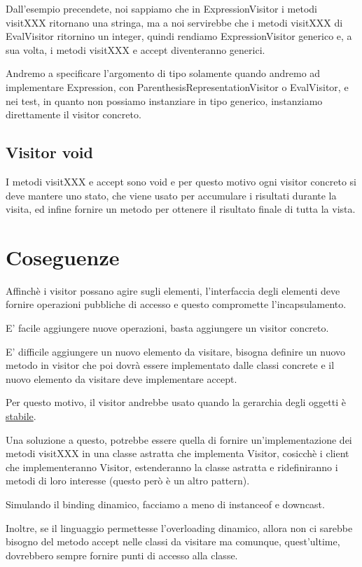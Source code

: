 Dall'esempio precendete, noi sappiamo che in ExpressionVisitor i metodi visitXXX ritornano una stringa, ma a noi servirebbe che i metodi visitXXX di EvalVisitor 
ritornino un integer, quindi rendiamo ExpressionVisitor generico e, a sua volta, i metodi visitXXX e accept diventeranno generici.

Andremo a specificare l'argomento di tipo solamente quando andremo ad implementare Expression, con ParenthesisRepresentationVisitor o EvalVisitor, e nei test, in quanto
non possiamo instanziare in tipo generico, instanziamo direttamente il visitor concreto.

\subsection{Visitor void}

I metodi visitXXX e accept sono void e per questo motivo ogni visitor concreto si deve mantere uno stato, che viene usato per accumulare i risultati durante la visita, 
ed infine fornire un metodo per ottenere il risultato finale di tutta la vista.

\section{Coseguenze}

Affinchè i visitor possano agire sugli elementi, l'interfaccia degli elementi deve fornire operazioni pubbliche di accesso e questo compromette l'incapsulamento.

E' facile aggiungere nuove operazioni, basta aggiungere un visitor concreto.

E' difficile aggiungere un nuovo elemento da visitare, bisogna definire un nuovo metodo in visitor che poi dovrà essere implementato dalle classi concrete e il nuovo 
elemento da visitare deve implementare accept.

Per questo motivo, il visitor andrebbe usato quando la gerarchia degli oggetti è \underline{stabile}.

Una soluzione a questo, potrebbe essere quella di fornire un'implementazione dei metodi visitXXX in una classe astratta che implementa Visitor, cosicchè i client che 
implementeranno Visitor, estenderanno la classe astratta e ridefiniranno i metodi di loro interesse (questo però è un altro pattern).

Simulando il binding dinamico, facciamo a meno di instanceof e downcast.

Inoltre, se il linguaggio permettesse l'overloading dinamico, allora non ci sarebbe bisogno del metodo accept nelle classi da visitare ma comunque, quest'ultime, 
dovrebbero sempre fornire punti di accesso alla classe.